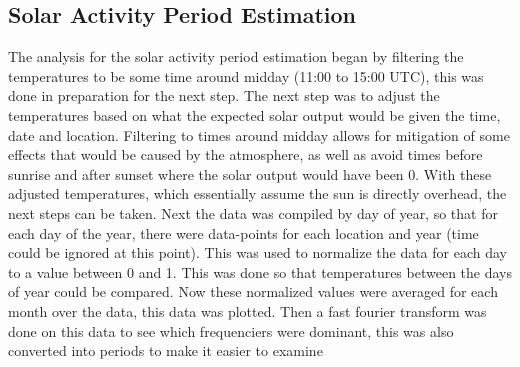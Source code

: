 \subsection{Solar Activity Period Estimation}
The analysis for the solar activity period estimation began by filtering the temperatures to be some time around midday (11:00 to 15:00 UTC), this was done in preparation for the next step. The next step was to adjust the temperatures based on what the expected solar output would be given the time, date and location. Filtering to times around midday allows for mitigation of some effects that would be caused by the atmosphere, as well as avoid times before sunrise and after sunset where the solar output would have been 0. With these adjusted temperatures, which essentially assume the sun is directly overhead, the next steps can be taken. Next the data was compiled by day of year, so that for each day of the year, there were data-points for each location and year (time could be ignored at this point). This was used to normalize the data for each day to a value between 0 and 1. This was done so that temperatures between the days of year could be compared. Now these normalized values were averaged for each month over the data, this data was plotted. Then a fast fourier transform was done on this data to see which frequenciers were dominant, this was also converted into periods to make it easier to examine